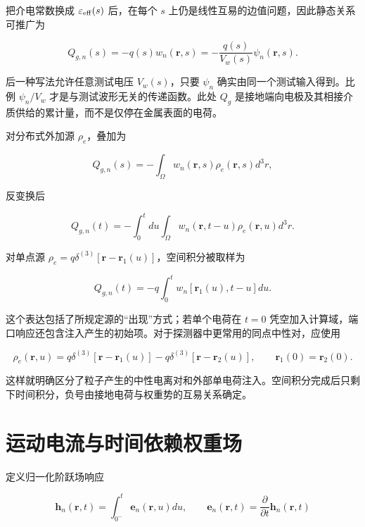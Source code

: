 \documentclass[
  11pt,
  a4paper,
  oneside,
  openany]{report}
\numberwithin{equation}{chapter}
\begin{document}
把介电常数换成 \(\varepsilon_{\rm eff}(s)\) 后，在每个 \(s\)
上仍是线性互易的边值问题，因此静态关系可推广为

\begin{equation}
Q_{g,n}(s)=-q(s)w_n(\mathbf r,s)
=-\frac{q(s)}{V_w(s)}\psi_n(\mathbf r,s).
\end{equation}

后一种写法允许任意测试电压 \(V_w(s)\)，只要 \(\psi_n\)
确实由同一个测试输入得到。比例 \(\psi_n/V_w\)
才是与测试波形无关的传递函数。此处 \(Q_g\)
是接地端向电极及其相接介质供给的累计量，而不是仅停在金属表面的电荷。

对分布式外加源 \(\rho_e\)，叠加为

\begin{equation}
Q_{g,n}(s)=-\int_\Omega w_n(\mathbf r,s)\rho_e(\mathbf r,s)d^3r,
\end{equation}

反变换后

\begin{equation}
Q_{g,n}(t)=-\int_0^tdu\int_\Omega
w_n(\mathbf r,t-u)\rho_e(\mathbf r,u)d^3r.
\end{equation}

对单点源
\(\rho_e=q\delta^{(3)}[\mathbf r-\mathbf r_1(u)]\)，空间积分被取样为

\begin{equation}
Q_{g,n}(t)=-q\int_0^tw_n[\mathbf r_1(u),t-u]du.
\end{equation}

这个表达包括了所规定源的``出现''方式；若单个电荷在 \(t=0\)
凭空加入计算域，端口响应还包含注入产生的初始项。对于探测器中更常用的同点中性对，应使用

\begin{equation}
\rho_e(\mathbf r,u)=q\delta^{(3)}[\mathbf r-\mathbf r_1(u)]
-q\delta^{(3)}[\mathbf r-\mathbf r_2(u)],\qquad \mathbf r_1(0)=\mathbf r_2(0).
\end{equation}

这样就明确区分了粒子产生的中性电离对和外部单电荷注入。空间积分完成后只剩下时间积分，负号由接地电荷与权重势的互易关系确定。

\section{运动电流与时间依赖权重场}\label{sec-dynamic-current}

定义归一化阶跃场响应

\begin{equation}
\mathbf h_n(\mathbf r,t)=\int_{0^-}^t\mathbf e_n(\mathbf r,u)du,
\qquad \mathbf e_n(\mathbf r,t)=\frac{\partial}{\partial t}\mathbf h_n(\mathbf r,t)
\end{equation}
\end{document}
